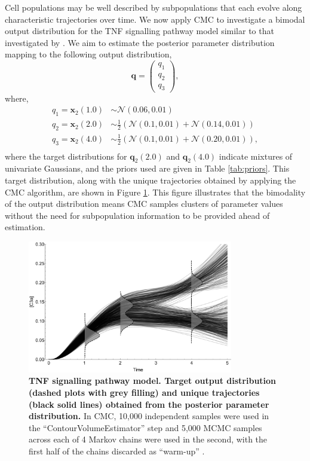 Cell populations may be well described by subpopulations that each evolve along characteristic trajectories over time. We now apply CMC to investigate a bimodal output distribution for the TNF signalling pathway model similar to that investigated by \cite{hasenauer2011identification}. We aim to estimate the posterior parameter distribution mapping to the following output distribution,
%
\begin{equation}
\boldsymbol{q} = \begin{pmatrix} q_1 \\ q_2 \\ q_3 \end{pmatrix},
\end{equation}
where,
\begin{equation}
\begin{aligned}
q_1 = \boldsymbol{x}_2(1.0) &\sim \mathcal{N}(0.06, 0.01)\\
q_2 = \boldsymbol{x}_2(2.0) &\sim\frac{1}{2}\left(\mathcal{N}(0.1, 0.01) + \mathcal{N}(0.14, 0.01)\right)\\
q_3 = \boldsymbol{x}_2(4.0) &\sim\frac{1}{2}\left(\mathcal{N}(0.1, 0.01) + \mathcal{N}(0.20, 0.01)\right),\\
\end{aligned}
\end{equation}
%
where the target distributions for $\boldsymbol{q}_2(2.0)$ and $\boldsymbol{q}_2(4.0)$ indicate mixtures of univariate Gaussians, and the priors used are given in Table \ref{tab:priors}. This target distribution, along with the unique trajectories obtained by applying the CMC algorithm, are shown in Figure \ref{fig:tnf_samples_vs_distribution}. This figure illustrates that the bimodality of the output distribution means CMC samples clusters of parameter values without the need for subpopulation information to be provided ahead of estimation.

\begin{figure}[H]
	\centerline{\includegraphics[width=0.8\textwidth]{../figures/tnf_samples_vs_distribution.pdf}}
	\caption{\textbf{TNF signalling pathway model. Target output distribution (dashed plots with grey filling) and unique trajectories (black solid lines) obtained from the posterior parameter distribution.} In CMC, 10,000 independent samples were used in the ``ContourVolumeEstimator'' step and 5,000 MCMC samples across each of 4 Markov chains were used in the second, with the first half of the chains discarded as ``warm-up'' \cite{lambert2018Student}.}
	\label{fig:tnf_samples_vs_distribution}
\end{figure}


